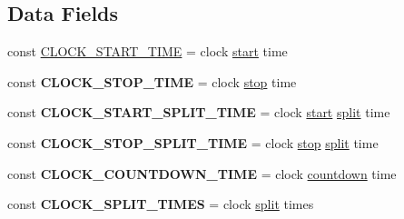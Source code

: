 \subsection*{Data Fields}
\begin{DoxyCompactItemize}
\item 
const \hyperlink{class_able_polecat___clock_aa04a01c008eabae54e6d664fe47de8a0}{C\+L\+O\+C\+K\+\_\+\+S\+T\+A\+R\+T\+\_\+\+T\+I\+M\+E} = \textquotesingle{}clock \hyperlink{class_able_polecat___clock_a858036aeb7d29d5d0e314454045b1684}{start} time\textquotesingle{}
\item 
\hypertarget{class_able_polecat___clock_a14062a362fa72279a8dc01f9f8e59720}{}const {\bfseries C\+L\+O\+C\+K\+\_\+\+S\+T\+O\+P\+\_\+\+T\+I\+M\+E} = \textquotesingle{}clock \hyperlink{class_able_polecat___clock_a8b6fc76a620d7557d06e9a11a9ffb509}{stop} time\textquotesingle{}\label{class_able_polecat___clock_a14062a362fa72279a8dc01f9f8e59720}

\item 
\hypertarget{class_able_polecat___clock_a4b295353e3c3f49019addbd92064df28}{}const {\bfseries C\+L\+O\+C\+K\+\_\+\+S\+T\+A\+R\+T\+\_\+\+S\+P\+L\+I\+T\+\_\+\+T\+I\+M\+E} = \textquotesingle{}clock \hyperlink{class_able_polecat___clock_a858036aeb7d29d5d0e314454045b1684}{start} \hyperlink{class_able_polecat___clock_a6c0c41e7a45a3c1899074b89c235114c}{split} time\textquotesingle{}\label{class_able_polecat___clock_a4b295353e3c3f49019addbd92064df28}

\item 
\hypertarget{class_able_polecat___clock_abc28951694c8f0946bed5f32be7e72d0}{}const {\bfseries C\+L\+O\+C\+K\+\_\+\+S\+T\+O\+P\+\_\+\+S\+P\+L\+I\+T\+\_\+\+T\+I\+M\+E} = \textquotesingle{}clock \hyperlink{class_able_polecat___clock_a8b6fc76a620d7557d06e9a11a9ffb509}{stop} \hyperlink{class_able_polecat___clock_a6c0c41e7a45a3c1899074b89c235114c}{split} time\textquotesingle{}\label{class_able_polecat___clock_abc28951694c8f0946bed5f32be7e72d0}

\item 
\hypertarget{class_able_polecat___clock_aabe31eab70b88f293f93d58f11f336ca}{}const {\bfseries C\+L\+O\+C\+K\+\_\+\+C\+O\+U\+N\+T\+D\+O\+W\+N\+\_\+\+T\+I\+M\+E} = \textquotesingle{}clock \hyperlink{class_able_polecat___clock_a40b2ead9e71a4258814b01d3f9d9298b}{countdown} time\textquotesingle{}\label{class_able_polecat___clock_aabe31eab70b88f293f93d58f11f336ca}

\item 
\hypertarget{class_able_polecat___clock_a90bdf45efb424f441df38a4ba71b1324}{}const {\bfseries C\+L\+O\+C\+K\+\_\+\+S\+P\+L\+I\+T\+\_\+\+T\+I\+M\+E\+S} = \textquotesingle{}clock \hyperlink{class_able_polecat___clock_a6c0c41e7a45a3c1899074b89c235114c}{split} times\textquotesingle{}\label{class_able_polecat___clock_a90bdf45efb424f441df38a4ba71b1324}


\end{DoxyCompactItemize}
